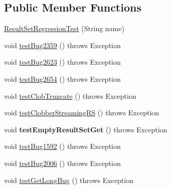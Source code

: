 \subsection*{Public Member Functions}
\begin{DoxyCompactItemize}
\item 
\mbox{\hyperlink{classtestsuite_1_1regression_1_1_result_set_regression_test_a5ca33c73ced6b3a694b444d75b08413b}{Result\+Set\+Regression\+Test}} (String name)
\item 
void \mbox{\hyperlink{classtestsuite_1_1regression_1_1_result_set_regression_test_abbc0f0354f17c3a1468ce5edd59b7ed0}{test\+Bug2359}} ()  throws Exception 
\item 
void \mbox{\hyperlink{classtestsuite_1_1regression_1_1_result_set_regression_test_a5cf13074c3f54ef463c169be1423a3ba}{test\+Bug2623}} ()  throws Exception 
\item 
void \mbox{\hyperlink{classtestsuite_1_1regression_1_1_result_set_regression_test_a32ba87707ddb894483b0813570ec5571}{test\+Bug2654}} ()  throws Exception 
\item 
void \mbox{\hyperlink{classtestsuite_1_1regression_1_1_result_set_regression_test_a4a5ee07e3208b64df9f192a86b6a4993}{test\+Clob\+Truncate}} ()  throws Exception 
\item 
void \mbox{\hyperlink{classtestsuite_1_1regression_1_1_result_set_regression_test_a98618c59f0d4f7f13323676c6352cdc8}{test\+Clobber\+Streaming\+RS}} ()  throws Exception 
\item 
\mbox{\label{classtestsuite_1_1regression_1_1_result_set_regression_test_aa66e7a3d877155bf047bd8f2dd7e42cb}} 
void {\bfseries test\+Empty\+Result\+Set\+Get} ()  throws Exception 
\item 
void \mbox{\hyperlink{classtestsuite_1_1regression_1_1_result_set_regression_test_a5f550a75e1f4f38d642553a5115f9257}{test\+Bug1592}} ()  throws Exception 
\item 
void \mbox{\hyperlink{classtestsuite_1_1regression_1_1_result_set_regression_test_a629011171ee3f908eb188d2f9ad1ea35}{test\+Bug2006}} ()  throws Exception 
\item 
void \mbox{\hyperlink{classtestsuite_1_1regression_1_1_result_set_regression_test_ad99758a5458b83ac934b1a347ae47e5a}{test\+Get\+Long\+Bug}} ()  throws Exception 
\item 
\mbox{\label{classtestsuite_1_1regression_1_1_result_set_regression_test_a23489ba51cbd6ffe491828ee72a871f1}} 

\end{DoxyCompactItemize}
